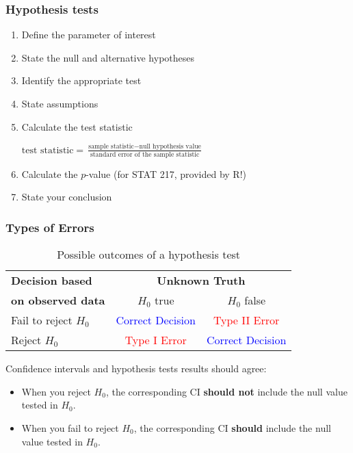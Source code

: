 \begin{frame}[label=tests]
\frametitle{Hypothesis tests}
\begin{enumerate}
    \item
    Define the parameter of interest
    \item
    State the null and alternative hypotheses
    \item
    Identify the appropriate test
    \item
    State assumptions
    \item
    Calculate the test statistic
    \begin{center}
    $\displaystyle \mbox{test statistic} = \frac{\mbox{sample statistic}-\mbox{null hypothesis value}}{\mbox{standard error of the sample statistic}}$
    \end{center}
    \item
    Calculate the $p$-value (for STAT 217, provided by R!)
    \item
    State your conclusion
\end{enumerate}
\begin{flushright}
\hyperlink{topics}{}
\end{flushright}
\end{frame}


\begin{frame}[label=errors]
\frametitle{Types of Errors}
\begin{table}[H]
\caption{Possible outcomes of a hypothesis test}
\begin{center}
 \begin{tabular}{l|cc|}
    \cline{2-3}
    \textbf{Decision based} & \multicolumn{2}{|c|}{\textbf{Unknown Truth}}\\
    \textbf{on observed data}                                                         & $H_0$ true                   & $H_0$ false \\
    \cline{2-3}
     Fail to reject $H_0$ &\textcolor{blue}{Correct Decision}  & \textcolor{red}{Type II Error}\\
                                            Reject $H_0$ & \textcolor{red}{Type I Error} & \textcolor{blue}{Correct Decision}\\
  \cline{2-3}
\end{tabular}%
\end{center}
\end{table}
\vskip10pt
Confidence intervals and hypothesis tests results should agree:
\begin{itemize}
        \item
        When you reject $H_0$, the corresponding CI \textbf{should not} include the null value tested in $H_0$.
        \item
        When you fail to reject $H_0$, the corresponding CI \textbf{should} include the null value tested in $H_0$.
\end{itemize}
\begin{flushright}
\hyperlink{topics}{}
\end{flushright}
\end{frame}



